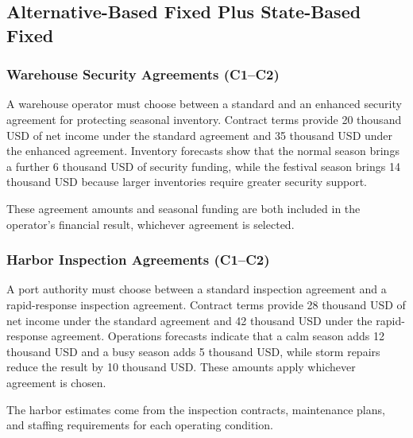 	
	\subsection{Alternative-Based Fixed Plus State-Based Fixed}
	\label{sec:alternative-based-fixed-payoff-plus-state-based-fixed-payoff}



	\subsubsection{Warehouse Security Agreements (C1--C2)}
	\label{sec:problem24-warehouse-security-agreements-c1-c2}
	
	A warehouse operator must choose between a standard and an enhanced security agreement for protecting seasonal inventory. Contract terms provide 20 thousand USD of net income under the standard agreement and 35 thousand USD under the enhanced agreement. Inventory forecasts show that the normal season brings a further 6 thousand USD of security funding, while the festival season brings 14 thousand USD because larger inventories require greater security support.
	
	These agreement amounts and seasonal funding are both included in the operator’s financial result, whichever agreement is selected.
	
	\subsubsection{Harbor Inspection Agreements (C1--C2)}
	\label{sec:problem25-harbor-inspection-agreements-c1-c2}
	
	A port authority must choose between a standard inspection agreement and a rapid-response inspection agreement. Contract terms provide 28 thousand USD of net income under the standard agreement and 42 thousand USD under the rapid-response agreement. Operations forecasts indicate that a calm season adds 12 thousand USD and a busy season adds 5 thousand USD, while storm repairs reduce the result by 10 thousand USD. These amounts apply whichever agreement is chosen.
	
	The harbor estimates come from the inspection contracts, maintenance plans, and staffing requirements for each operating condition.

